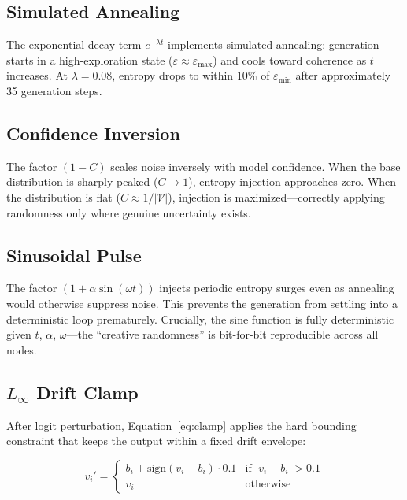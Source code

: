 \documentclass[11pt,a4paper]{article}
\begin{document}
\subsection{Simulated Annealing}

The exponential decay term $e^{-\lambda t}$ implements simulated annealing: generation starts in a high-exploration state ($\varepsilon \approx \varepsilon_{\max}$) and cools toward coherence as $t$ increases. At $\lambda = 0.08$, entropy drops to within 10\% of $\varepsilon_{\min}$ after approximately 35 generation steps.

\subsection{Confidence Inversion}

The factor $(1 - C)$ scales noise inversely with model confidence. When the base distribution is sharply peaked ($C \to 1$), entropy injection approaches zero. When the distribution is flat ($C \approx 1/|\mathcal{V}|$), injection is maximized—correctly applying randomness only where genuine uncertainty exists.

\subsection{Sinusoidal Pulse}

The factor $(1 + \alpha\sin(\omega t))$ injects periodic entropy surges even as annealing would otherwise suppress noise. This prevents the generation from settling into a deterministic loop prematurely. Crucially, the sine function is fully deterministic given $t$, $\alpha$, $\omega$—the ``creative randomness'' is bit-for-bit reproducible across all nodes.

\subsection{$L_\infty$ Drift Clamp}

After logit perturbation, Equation~\eqref{eq:clamp} applies the hard bounding constraint that keeps the output within a fixed drift envelope:

\begin{equation}
v_i' = \begin{cases}
  b_i + \text{sign}(v_i - b_i)\cdot 0.1 & \text{if } |v_i - b_i| > 0.1 \\
  v_i & \text{otherwise}
\end{cases}
\label{eq:clamp}
\end{equation}
\end{document}
